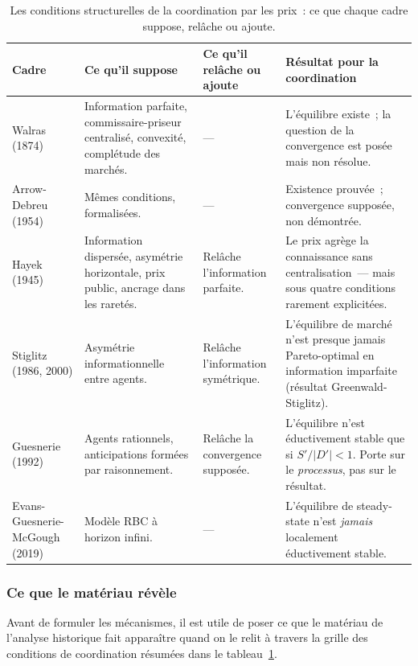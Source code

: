 \begin{table}[!ht]
\caption{Les conditions structurelles de la coordination par les prix~: ce que chaque cadre suppose, relâche ou ajoute.}\label{tab:d6-conditions}
\centering\footnotesize
\renewcommand{\arraystretch}{1.35}
\begin{tabularx}{\textwidth}{@{}p{2.4cm}p{3.5cm}p{3.5cm}X@{}}
\toprule
\textbf{Cadre} & \textbf{Ce qu'il suppose} & \textbf{Ce qu'il relâche ou ajoute} & \textbf{Résultat pour la coordination} \\
\midrule
Walras (1874) & Information parfaite, commissaire-priseur centralisé, convexité, complétude des marchés. & — & L'équilibre existe~; la question de la convergence est posée mais non résolue. \\[4pt]
Arrow-Debreu (1954) & Mêmes conditions, formalisées. & — & Existence prouvée~; convergence supposée, non démontrée. \\[4pt]
Hayek (1945) & Information dispersée, asymétrie horizontale, prix public, ancrage dans les raretés. & Relâche l'information parfaite. & Le prix agrège la connaissance sans centralisation~--- mais sous quatre conditions rarement explicitées. \\[4pt]
Stiglitz (1986, 2000) & Asymétrie informationnelle entre agents. & Relâche l'information symétrique. & L'équilibre de marché n'est presque jamais Pareto-optimal en information imparfaite (résultat Greenwald-Stiglitz). \\[4pt]
Guesnerie (1992) & Agents rationnels, anticipations formées par raisonnement. & Relâche la convergence supposée. & L'équilibre n'est éductivement stable que si $S'/|D'| < 1$. Porte sur le \emph{processus}, pas sur le résultat. \\[4pt]
Evans-Guesnerie-McGough (2019) & Modèle RBC à horizon infini. & — & L'équilibre de steady-state n'est \emph{jamais} localement éductivement stable. \\
\bottomrule
\end{tabularx}
\renewcommand{\arraystretch}{1.0}
\end{table}


\subsubsection{Ce que le matériau révèle}

Avant de formuler les mécanismes, il est utile de poser ce que le matériau de l'analyse historique fait apparaître quand on le relit à travers la grille des conditions de coordination résumées dans le tableau~\ref{tab:d6-conditions}.

